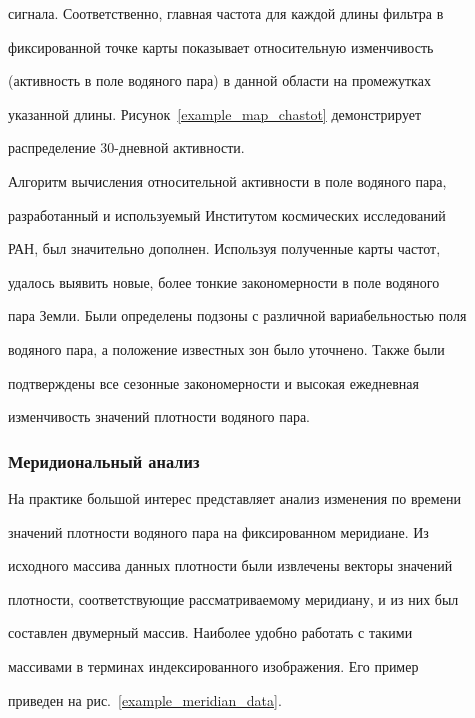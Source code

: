 сигнала. Соответственно, главная частота для каждой длины фильтра в

фиксированной точке карты показывает относительную изменчивость

(активность в поле водяного пара) в данной области на промежутках

указанной длины. Рисунок~\ref{example_map_chastot} демонстрирует

распределение 30-днев\-ной активности.



Алгоритм вычисления относительной активности в поле водяного пара,

разработанный и используемый Институтом космических исследований

РАН, был значительно дополнен. Используя полученные карты частот,

удалось выявить новые, более тонкие закономерности в поле водяного

пара Земли. Были определены подзоны с различной вариабельностью поля

водяного пара, а положение известных зон  было уточнено. Также были

подтверждены все сезонные закономерности и высокая ежедневная

изменчивость значений плотности водяного пара. 





\subsubsection{Меридиональный анализ}



На практике большой интерес представляет анализ изменения по времени

значений плотности водяного пара на фиксированном меридиане. Из

исходного массива данных плотности были извлечены векторы значений

плотности, соответствующие рассматриваемому меридиану, и из них был

составлен двумерный массив. Наиболее удобно работать с такими

массивами в терминах индексированного изображения. Его пример

приведен на рис.~\ref{example_meridian_data}.



